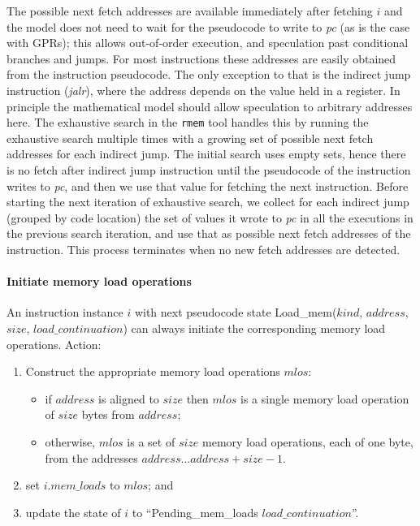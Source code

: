 \begin{commentary}
The possible next fetch addresses are available immediately after fetching $i$ and the model does not need to wait for the pseudocode to write to {\em pc} (as is the case with GPRs); this allows out-of-order execution, and speculation past conditional branches and jumps.
For most instructions these addresses are easily obtained from the instruction pseudocode.
The only exception to that is the indirect jump instruction ({\em jalr}), where the address depends on the value held in a register.
%
In principle the mathematical model should allow speculation to
arbitrary addresses here. 
%
The exhaustive search in the {\tt rmem} tool handles this by running the exhaustive search multiple times with a growing set of possible next fetch addresses for each indirect jump.
The initial search uses empty sets, hence there is no fetch after indirect jump instruction until the pseudocode of the instruction writes to {\em pc}, and then we use that value for fetching the next instruction.
Before starting the next iteration of exhaustive search, we collect for each indirect jump (grouped by code location) the set of values it wrote to {\em pc} in all the executions in the previous search iteration, and use that as possible next fetch addresses of the instruction.
This process terminates when no new fetch addresses are detected.
\end{commentary}

\paragraph{Initiate memory load operations}\label{omm:initiate_load}
An instruction instance $i$ with next pseudocode state {\sc Load\_mem}($kind$, $address$, $size$, $load\_continuation$) can always initiate the corresponding memory load operations.
Action:
\begin{enumerate}
\item Construct the appropriate memory load operations $mlos$:
  \begin{itemize}
  \item if $address$ is aligned to $size$ then $mlos$ is a single memory load operation of $size$ bytes from $address$;
  \item otherwise, $mlos$ is a set of $size$ memory load operations, each of one byte, from the addresses $address\ldots address+size-1$.
  \end{itemize}
\item set $i.mem\_loads$ to $mlos$; and
\item update the state of $i$ to ``{\sc Pending\_mem\_loads} $load\_continuation$''.
\end{enumerate}

